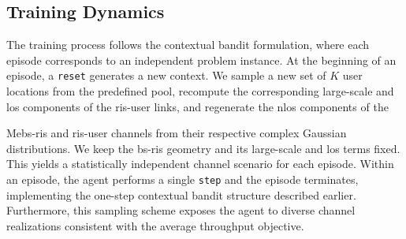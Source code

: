 \subsection{Training Dynamics}
\label{sec:training_dynamics}
The training process follows the contextual bandit formulation, where each episode corresponds to an independent problem instance. At the beginning of an episode, a \texttt{reset} generates a new context. We sample a new set of $K$ user locations from the predefined pool, recompute the corresponding large-scale and \gls{los} components of the \gls{ris}-user links, and regenerate the \gls{nlos} components of the 

Me\gls{bs}-\gls{ris} and \gls{ris}-user channels from their respective complex Gaussian distributions. We keep the \gls{bs}-\gls{ris} geometry and its large-scale and \gls{los} terms fixed. This yields a statistically independent channel scenario for each episode. Within an episode, the agent performs a single \texttt{step} and the episode terminates, implementing the one-step contextual bandit structure described earlier. Furthermore, this sampling scheme exposes the agent to diverse channel realizations consistent with the average throughput objective.

